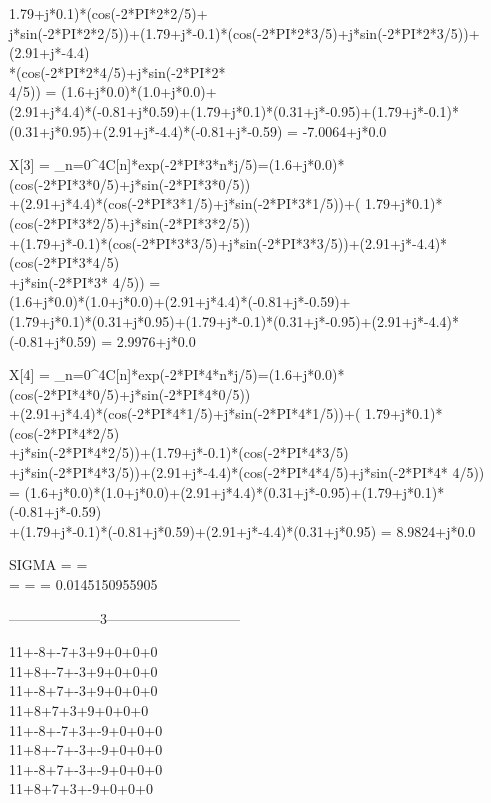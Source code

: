 \documentclass[landscape, 12pt]{report}
\begin{document}
1.79+j*0.1)*(cos(-2*PI*2*2/5)+\\j*sin(-2*PI*2*2/5))+(1.79+j*-0.1)*(cos(-2*PI*2*3/5)+j*sin(-2*PI*2*3/5))+(2.91+j*-4.4)\\*(cos(-2*PI*2*4/5)+j*sin(-2*PI*2*\\

4/5)) = (1.6+j*0.0)*(1.0+j*0.0)+\\(2.91+j*4.4)*(-0.81+j*0.59)+(1.79+j*0.1)*(0.31+j*-0.95)+(1.79+j*-0.1)*(0.31+j*0.95)+(2.91+j*-4.4)*(-0.81+j*-0.59) =
-7.0064+j*0.0\par

X[3] = \sum_{n=0}^{4}{C[n]*exp(-2*PI*3*n*j/5)}=(1.6+j*0.0)*(cos(-2*PI*3*0/5)+j*sin(-2*PI*3*0/5))\\+(2.91+j*4.4)*(cos(-2*PI*3*1/5)+j*sin(-2*PI*3*1/5))+(
1.79+j*0.1)*(cos(-2*PI*3*2/5)+j*sin(-2*PI*3*2/5))\\+(1.79+j*-0.1)*(cos(-2*PI*3*3/5)+j*sin(-2*PI*3*3/5))+(2.91+j*-4.4)*(cos(-2*PI*3*4/5)\\+j*sin(-2*PI*3*
4/5)) = \\(1.6+j*0.0)*(1.0+j*0.0)+(2.91+j*4.4)*(-0.81+j*-0.59)+\\(1.79+j*0.1)*(0.31+j*0.95)+(1.79+j*-0.1)*(0.31+j*-0.95)+(2.91+j*-4.4)*(-0.81+j*0.59) =
2.9976+j*0.0\par
X[4] = \sum_{n=0}^{4}{C[n]*exp(-2*PI*4*n*j/5)}=(1.6+j*0.0)*(cos(-2*PI*4*0/5)+j*sin(-2*PI*4*0/5))\\+(2.91+j*4.4)*(cos(-2*PI*4*1/5)+j*sin(-2*PI*4*1/5))+(
1.79+j*0.1)*(cos(-2*PI*4*2/5)\\+j*sin(-2*PI*4*2/5))+(1.79+j*-0.1)*(cos(-2*PI*4*3/5)\\+j*sin(-2*PI*4*3/5))+(2.91+j*-4.4)*(cos(-2*PI*4*4/5)+j*sin(-2*PI*4*
4/5)) \\= (1.6+j*0.0)*(1.0+j*0.0)+(2.91+j*4.4)*(0.31+j*-0.95)+(1.79+j*0.1)*(-0.81+j*-0.59)\\+(1.79+j*-0.1)*(-0.81+j*0.59)+(2.91+j*-4.4)*(0.31+j*0.95) =
8.9824+j*0.0\par
SIGMA = =  \\=  =  = 0.0145150955905\\


\begin{center}
--------------------3-----------------------------
\end{center}
11+-8+-7+3+9+0+0+0\\
11+8+-7+-3+9+0+0+0\\
11+-8+7+-3+9+0+0+0\\
11+8+7+3+9+0+0+0\\
11+-8+-7+3+-9+0+0+0\\
11+8+-7+-3+-9+0+0+0\\
11+-8+7+-3+-9+0+0+0\\
11+8+7+3+-9+0+0+0\\
\end{document}
